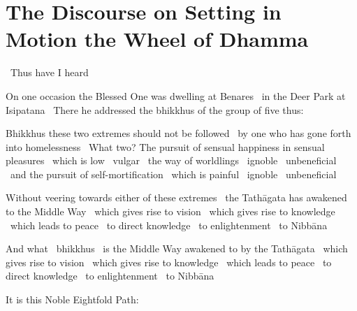 \section{The Discourse on Setting in Motion the Wheel of Dhamma}
\label{wheel-of-dhamma-full}

\begin{leader-english}
  \anglebracketleft\ \hspace{-0.5mm}Thus have I heard \hspace{-0.5mm}\anglebracketright\
\end{leader-english}

\begin{english-only-hang}
  On one occasion the Blessed One was dwelling at Benares \breathmark\ in the Deer Park at Isipatana \breathmark\ There he addressed the bhikkhus of the group of five thus:
\end{english-only-hang}

\begin{english-only-hang}
  Bhikkhus these two extremes should not be followed \breathmark\ by one who has gone forth into homelessness \breathmark\ What two? The pursuit of sensual happiness in sensual pleasures \breathmark\ which is low \breathmark\ vulgar \breathmark\ the way of worldlings \breathmark\ ignoble \breathmark\ unbeneficial \breathmark\ and the pursuit of self-mortification \breathmark\ which is painful \breathmark\ ignoble \breathmark\ unbeneficial
\end{english-only-hang}

\begin{english-only-hang}
  Without veering towards either of these extremes \breathmark\ the Tathāgata has awakened to the Middle Way \breathmark\ which gives rise to vision \breathmark\ which gives rise to knowledge \breathmark\ which leads to peace \breathmark\ to direct knowledge \breathmark\ to enlightenment \breathmark\ to Nibbāna
\end{english-only-hang}

\begin{english-only-hang}
  And what \breathmark\ bhikkhus \breathmark\ is the Middle Way awakened to by the Tathāgata \breathmark\ which gives rise to vision \breathmark\ which gives rise to knowledge \breathmark\ which leads to peace \breathmark\ to direct knowledge \breathmark\ to enlightenment \breathmark\ to Nibbāna
\end{english-only-hang}

\begin{english-only-hang}
  It is this Noble Eightfold Path:
\end{english-only-hang}

